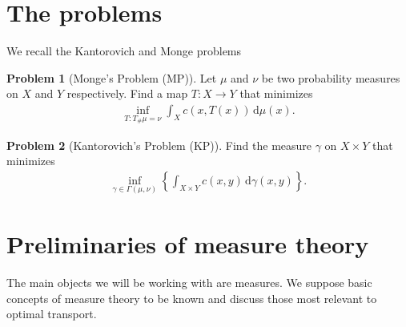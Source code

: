 \documentclass[
    a4paper,
    DIV=14,
    abstract=true,
    numbers=noenddot
]
{scrartcl}
\theoremstyle{definition}
\newtheorem{problem}{Problem}
\newcommand{\set}[1]{\left\{#1\right\}}
\renewcommand{\d}{\,\mathrm{d}}\newcommand{\dx}{\,\mathrm{d}x}
\begin{document}
\section{The problems}
We recall the Kantorovich and Monge problems
\begin{problem}[Monge's Problem (MP)]
Let $\mu$ and $\nu$ be two probability measures on $X$ and $Y$ respectively. Find a map $T:X \to Y$ that minimizes
\begin{align}\tag{MP}\label{MP}
    \inf_{T: T_\#\mu = \nu} \int_X c(x, T(x)) \d\mu(x).
\end{align}
\end{problem}
\begin{problem}[Kantorovich's Problem (KP)]\label{kantorovich}
Find the measure $\gamma $ on $X\times Y$ that minimizes
\begin{align}\tag{KP}\label{KP}
    \inf_{\gamma \in \Gamma (\mu ,\nu )}\set{\int_{X\times Y} c(x,y) \d \gamma (x,y)}.
\end{align}
\end{problem}


\section{Preliminaries of measure theory}
The main objects we will be working with are measures. We suppose basic concepts of measure theory to be known and discuss those most relevant to optimal transport.
\end{document}
